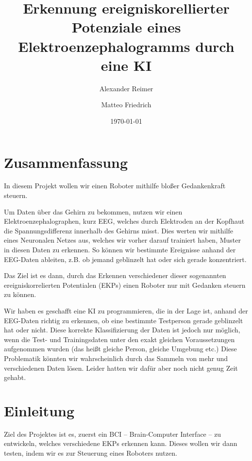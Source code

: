 \documentclass{scrartcl}
\title{Erkennung ereigniskorellierter Potenziale eines Elektroenzephalogramms durch eine KI}
\date{\today}
\author{Alexander Reimer \and Matteo Friedrich}
\begin{document}
	\newcommand{\sig}{\textrm{sig}}
	\newcommand{\netin}{\textrm{netzinput}}

	\newcommand{\threesub}[1]{
		\vspace{1ex}
	\noindent \textbf{#1}
	\vspace{0.5ex}}

	\maketitle

	\newpage
	
	\tableofcontents
	
	\newpage

	\section{Zusammenfassung}


	In diesem Projekt wollen wir einen Roboter mithilfe bloßer Gedankenkraft steuern.

	Um Daten über das Gehirn zu bekommen, nutzen wir einen Elektroenzephalographen, kurz EEG, welches durch Elektroden an der Kopfhaut die Spannungsdifferenz innerhalb des Gehirns misst. Dies werten wir mithilfe eines Neuronalen Netzes aus, welches wir vorher darauf trainiert haben, Muster in diesen Daten zu erkennen. So können wir bestimmte Ereignisse anhand der EEG-Daten ableiten, z.B. ob jemand geblinzelt hat oder sich gerade konzentriert.
	
	Das Ziel ist es dann, durch das Erkennen verschiedener dieser sogenannten ereigniskorrelierten Potentialen (EKPs) einen Roboter nur mit Gedanken steuern zu können.
	
	
	Wir haben es geschafft eine KI zu programmieren, die in der Lage ist, anhand der EEG-Daten richtig zu erkennen, ob eine bestimmte Testperson gerade geblinzelt hat oder nicht. Diese korrekte Klassifizierung der Daten ist jedoch nur möglich, wenn die Test- und Trainingsdaten unter den exakt gleichen Voraussetzungen aufgenommen wurden (das heißt gleiche Person, gleiche Umgebung etc.) Diese Problematik könnten wir wahrscheinlich durch das Sammeln von mehr und verschiedenen Daten lösen. Leider hatten wir dafür aber noch nicht genug Zeit gehabt.	

	\section{Einleitung}

	Ziel des Projektes ist es, zuerst ein BCI -- Brain-Computer Interface – zu entwickeln, welches verschiedene EKPs erkennen kann. Dieses wollen wir dann testen, indem wir es zur Steuerung eines Roboters nutzen.
\end{document}
